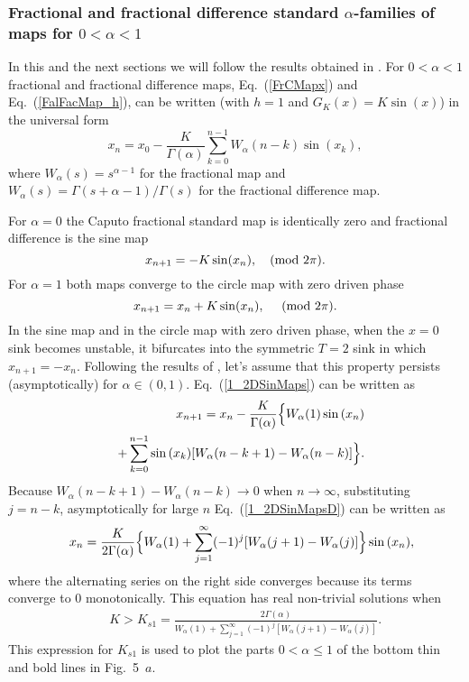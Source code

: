 \documentclass[graybox]{svmult}
\begin{document}
\subsubsection{Fractional and fractional difference standard $\alpha$-families of maps for $0<\alpha<1$}

In this and the next sections we will follow the results obtained 
in \cite{ME8}.
For $0<\alpha<1$ fractional and fractional difference maps, Eq.~(\ref{FrCMapx}) and Eq.~(\ref{FalFacMap_h}), can be written (with $h=1$ and $G_K(x)=K \sin(x)$) in the universal form
\begin{equation}
x_{n}=  x_0- 
\frac{K}{\Gamma(\alpha)}\sum^{n-1}_{k=0} W_{\alpha}(n-k) \sin{(x_k)},
\label{1_2DSinMaps}
\end{equation}
where $W_{\alpha}(s) = s^{\alpha-1}$ for the fractional map and
 $W_{\alpha}(s) ={\Gamma(s+\alpha-1)}/{\Gamma(s)}$ for the fractional
 difference map.

For $\alpha=0$ the Caputo fractional standard map is identically zero and fractional difference is the sine map 
\begin{equation}
x_{n+1} = -K\sin(x_n), \ \ \ ({\rm mod} \ 2\pi ).
\label{SM0D}
\end{equation} 
For $\alpha=1$ both maps converge to the circle map with zero driven phase
\begin{equation}
x_{n+1}= x_n + K \sin (x_n), \ \ \ \ ({\rm mod} \ 2\pi ).
\label{SM1DNeg} 
\end{equation}
In the sine map and in the circle map with zero driven phase,
when the $x=0$ sink becomes unstable, it bifurcates into
the symmetric $T=2$ sink in which $x_{n+1}=-x_{n}$.
Following the results of \cite{ME8}, let's assume that 
this property persists (asymptotically) for $\alpha \in (0,1)$.
Eq.~(\ref{1_2DSinMaps}) can be written as
{\setlength\arraycolsep{0.5pt}   
\begin{eqnarray} 
&&x_{n+1}=  x_n- 
\frac{K}{\Gamma(\alpha)} \Bigl\{  W_{\alpha}(1) \sin{(x_n)} \nonumber \\
&&+\sum^{n-1}_{k=0} \sin{(x_k)} [W_{\alpha}(n-k+1)-W_{\alpha}(n-k)]\Bigr\}. 
\label{1_2DSinMapsD}
\end{eqnarray}
}
Because $W_{\alpha}(n-k+1)-W_{\alpha}(n-k) \rightarrow 0$
when $n \rightarrow \infty$, substituting $j=n-k$, asymptotically for large $n$ Eq.~(\ref{1_2DSinMapsD}) can be written as
{\setlength\arraycolsep{0.5pt}   
\begin{eqnarray} 
&&x_n=\frac{K}{2\Gamma(\alpha)}\Bigl\{
  W_{\alpha}(1) +\sum^{\infty}_{j=1} (-1)^j[W_{\alpha}(j+1)-W_{\alpha}(j)]\Bigr\}\sin{(x_n)},
\label{1_2DSinMapsD1} 
\end{eqnarray}
}
where the alternating series on the right side converges because
its terms converge to 0 monotonically.
This equation has real non-trivial solutions when 
{\setlength\arraycolsep{0.5pt} 
\begin{eqnarray} 
&&K>K_{s1} =\frac{2\Gamma(\alpha)}{W_{\alpha}(1)
+\sum^{\infty}_{j=1} (-1)^j[W_{\alpha}(j+1)-W_{\alpha}(j)]}.
\label{1_2DSinMapsKcr}
\end{eqnarray}
}
This expression for $K_{s1}$ is used to plot the parts $0<\alpha \le1$ of the bottom thin and bold lines in 
Fig.~5~$a$.
\end{document}
